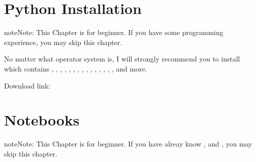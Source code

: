 \documentclass[letterpaper,12pt,english]{sphinxmanual}
\begin{document}
\chapter{Python Installation}
\label{\detokenize{install:python-installation}}\label{\detokenize{install:install}}\label{\detokenize{install::doc}}
\begin{sphinxadmonition}{note}{Note:}
This Chapter {\hyperref[\detokenize{install:install}]{}} is for beginner.  If you have some  programming experience, you may skip this chapter.
\end{sphinxadmonition}

No matter what operator system is, I will strongly recommend you to install  which contains , , , , , , , ,
, , , , , , ,  and more.

Download link: 

\begin{figure}[htbp]
\centering

\noindent{}
\end{figure}


\chapter{Notebooks}
\label{\detokenize{nb:notebooks}}\label{\detokenize{nb:nb}}\label{\detokenize{nb::doc}}
\begin{sphinxadmonition}{note}{Note:}
This Chapter {\hyperref[\detokenize{nb:nb}]{}} is for beginner.  If you have alreay know  ,  and , you may skip this chapter.
\end{sphinxadmonition}
\end{document}
